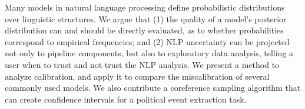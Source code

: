 Many models in natural language processing define probabilistic distributions over linguistic structures.  We argue that (1) the quality of a model's posterior distribution can and should be directly evaluated, as to whether probabilities correspond to empirical frequencies; and (2) NLP uncertainty can be projected not only to pipeline components, but also to exploratory data analysis, telling a user when to trust and not trust the NLP analysis. We present a method to analyze calibration, and apply it to compare the miscalibration of several commonly used models.  We also contribute a coreference sampling algorithm that can create confidence intervals for a political event extraction task.
